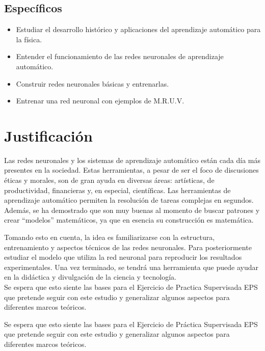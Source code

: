 \documentclass[titlepage,11pt]{article}
\begin{document}
\subsection{Específicos}
\label{sec:especificos}

\begin{itemize}
	\item Estudiar el desarrollo histórico y aplicaciones del aprendizaje automático para la física.
	\item Entender el funcionamiento de las redes neuronales de aprendizaje automático.
	\item Construir redes neuronales básicas y entrenarlas.
	\item Entrenar una red neuronal con ejemplos de M.R.U.V.
\end{itemize}

\section{Justificación}
\label{sec:justificacion}
Las redes neuronales y los sistemas de aprendizaje automático están cada día más presentes en la sociedad. Estas herramientas, a pesar de ser el foco de discusiones éticas y morales, son de gran ayuda en diversas áreas: artísticas, de productividad, financieras y, en especial, científicas. Las herramientas de aprendizaje automático permiten la resolución de tareas complejas en segundos. Además, se ha demostrado que son muy buenas al momento de buscar patrones y crear “modelos” matemáticos, ya que en esencia su construcción es matemática.

Tomando esto en cuenta, la idea es familiarizarse con la estructura, entrenamiento y aspectos técnicos de las redes neuronales. Para posteriormente estudiar el modelo que utiliza la red neuronal para reproducir los resultados experimentales. Una vez terminado, se tendrá una herramienta que puede ayudar en la didáctica y divulgación de la ciencia y tecnología.\\

Se espera que esto siente las bases para el Ejercicio de Practica Supervisada EPS que pretende seguir con este estudio y generalizar algunos aspectos para diferentes marcos teóricos.

Se espera que esto siente las bases para el Ejercicio de Práctica Supervisada EPS que pretende seguir con este estudio y generalizar algunos aspectos para diferentes marcos teóricos.
\end{document}
